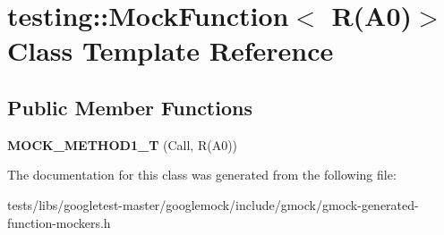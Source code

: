 \hypertarget{classtesting_1_1MockFunction_3_01R_07A0_08_4}{}\section{testing\+:\+:Mock\+Function$<$ R(A0)$>$ Class Template Reference}
\label{classtesting_1_1MockFunction_3_01R_07A0_08_4}
\subsection*{Public Member Functions}
\begin{DoxyCompactItemize}
\item 
\mbox{\label{classtesting_1_1MockFunction_3_01R_07A0_08_4_a6a22e7e14b53d2df30bef4404b41fade}} 
{\bfseries M\+O\+C\+K\+\_\+\+M\+E\+T\+H\+O\+D1\+\_\+T} (Call, R(A0))
\end{DoxyCompactItemize}


The documentation for this class was generated from the following file\+:\begin{DoxyCompactItemize}
\item 
tests/libs/googletest-\/master/googlemock/include/gmock/gmock-\/generated-\/function-\/mockers.\+h\end{DoxyCompactItemize}
